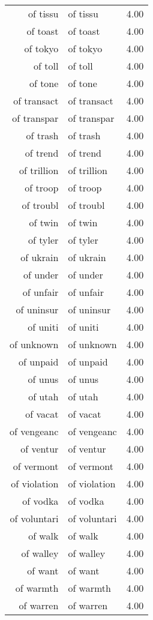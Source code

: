 \begin{table}[ht]
\begin{tabular}{rlr}
  of tissu & of tissu & 4.00 \\ 
  of toast & of toast & 4.00 \\ 
  of tokyo & of tokyo & 4.00 \\ 
  of toll & of toll & 4.00 \\ 
  of tone & of tone & 4.00 \\ 
  of transact & of transact & 4.00 \\ 
  of transpar & of transpar & 4.00 \\ 
  of trash & of trash & 4.00 \\ 
  of trend & of trend & 4.00 \\ 
  of trillion & of trillion & 4.00 \\ 
  of troop & of troop & 4.00 \\ 
  of troubl & of troubl & 4.00 \\ 
  of twin & of twin & 4.00 \\ 
  of tyler & of tyler & 4.00 \\ 
  of ukrain & of ukrain & 4.00 \\ 
  of under & of under & 4.00 \\ 
  of unfair & of unfair & 4.00 \\ 
  of uninsur & of uninsur & 4.00 \\ 
  of uniti & of uniti & 4.00 \\ 
  of unknown & of unknown & 4.00 \\ 
  of unpaid & of unpaid & 4.00 \\ 
  of unus & of unus & 4.00 \\ 
  of utah & of utah & 4.00 \\ 
  of vacat & of vacat & 4.00 \\ 
  of vengeanc & of vengeanc & 4.00 \\ 
  of ventur & of ventur & 4.00 \\ 
  of vermont & of vermont & 4.00 \\ 
  of violation & of violation & 4.00 \\ 
  of vodka & of vodka & 4.00 \\ 
  of voluntari & of voluntari & 4.00 \\ 
  of walk & of walk & 4.00 \\ 
  of walley & of walley & 4.00 \\ 
  of want & of want & 4.00 \\ 
  of warmth & of warmth & 4.00 \\ 
  of warren & of warren & 4.00 \\ 

\end{tabular}
\end{table}
